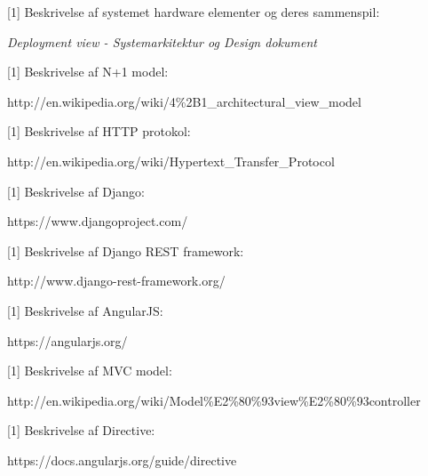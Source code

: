 [1] Beskrivelse af systemet hardware elementer og deres sammenspil:
\vspace{-0.3cm}

\qquad \textit{Deployment view - Systemarkitektur og Design dokument} \\
\vspace{-0.3cm}



[1] Beskrivelse af N+1 model:
\vspace{-0.3cm}

\qquad http://en.wikipedia.org/wiki/4\%2B1\_architectural\_view\_model \\ 
\vspace{-0.3cm}   

[1] Beskrivelse af HTTP protokol:
\vspace{-0.3cm}

\qquad http://en.wikipedia.org/wiki/Hypertext\_Transfer\_Protocol \\
\vspace{-0.3cm}

[1] Beskrivelse af Django:
\vspace{-0.3cm}

\qquad https://www.djangoproject.com/ \\ 
\vspace{-0.3cm}

[1] Beskrivelse af Django REST framework:
\vspace{-0.3cm}

\qquad http://www.django-rest-framework.org/ \\ 
\vspace{-0.3cm}

[1] Beskrivelse af AngularJS:
\vspace{-0.3cm}

\qquad https://angularjs.org/ \\ 
\vspace{-0.3cm}

[1] Beskrivelse af MVC model:
\vspace{-0.3cm}

\qquad http://en.wikipedia.org/wiki/Model\%E2\%80\%93view\%E2\%80\%93controller \\ 
\vspace{-0.3cm}

[1] Beskrivelse af Directive:
\vspace{-0.3cm}

\qquad https://docs.angularjs.org/guide/directive  
\vspace{-0.3cm}